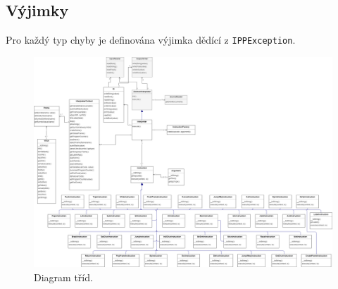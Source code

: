 \documentclass[11pt, letterpaper]{article}
\begin{document}
\subsection{Výjimky}

Pro každý typ chyby je definována výjimka dědící z \texttt{IPPException}.

\vspace{6em}

\begin{figure}[h]
  \centering
  \includegraphics[width=\textwidth]{diagram.png}
  \caption{Diagram tříd.}
  \label{fig:diagram}
\end{figure}
\end{document}
